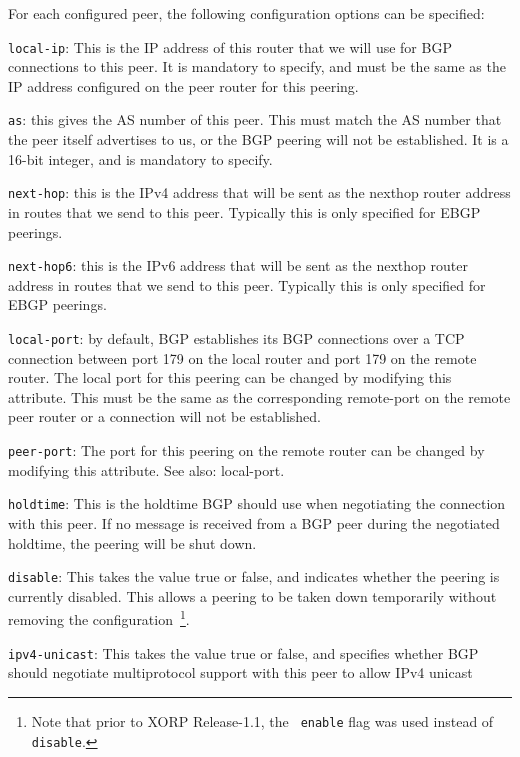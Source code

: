 \begin{description}
  For each configured {\stt peer}, the following
  configuration options can be specified:
\begin{description}
\item{\tt local-ip}: This is the IP address of this router that we
  will use for BGP connections to this peer.  It is mandatory to
  specify, and must be the same as the IP address configured on the
  peer router for this peering.
\item{\tt as}: this gives the AS number of this peer.  This must match
  the AS number that the peer itself advertises to us, or the BGP
  peering will not be established.  It is a 16-bit integer, and is
  mandatory to specify.
\item{\tt next-hop}: this is the IPv4 address that will be sent as the
  nexthop router address in routes that we send to this peer.
  Typically this is only specified for EBGP peerings.
\item{\tt next-hop6}: this is the IPv6 address that will be sent as the
  nexthop router address in routes that we send to this peer.
  Typically this is only specified for EBGP peerings.
\item{\tt local-port}: by default, BGP establishes its BGP connections
  over a TCP connection between port 179 on the local router and port
  179 on the remote router.  The local port for this peering can be
  changed by modifying this attribute.  This must be the same as the
  corresponding {\stt remote-port} on the remote peer router or a
  connection will not be established.
\item{\tt peer-port}: The port for this peering on the remote router
  can be changed by modifying this attribute. See also: {\stt
  local-port}.
\item{\tt holdtime}: This is the holdtime BGP should use when
  negotiating the connection with this peer.  If no message is
  received from a BGP peer during the negotiated holdtime, the
  peering will be shut down.
\item{\tt disable}: This takes the value {\stt true} or {\stt false},
  and indicates whether the peering is currently disabled.  This allows
  a peering to be taken down temporarily without removing the
  configuration~\footnote{Note that prior to XORP Release-1.1, the {\tt
  enable} flag was used instead of {\tt disable}.}.
\item{\tt ipv4-unicast}: This takes the value {\stt true} or {\stt false},
  and specifies whether BGP should
  negotiate multiprotocol support with this peer to allow IPv4 unicast

\end{description}
\end{description}
